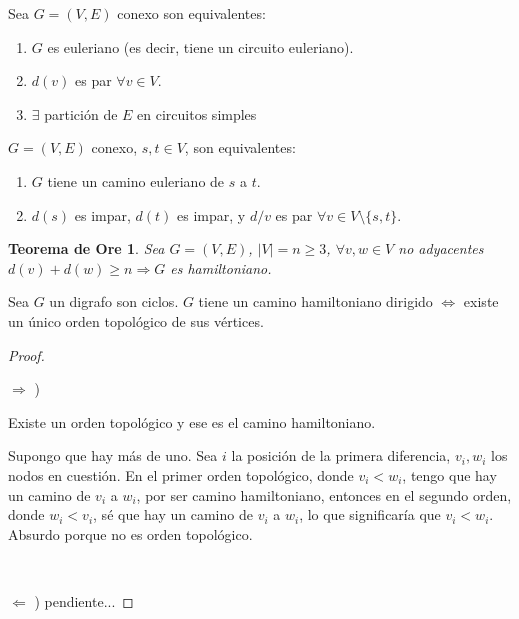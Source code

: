 \begin{teo}
Sea $G = (V, E)$ conexo son equivalentes:

\begin{enumerate}
    \item $G$ es euleriano (es decir, tiene un circuito euleriano).
    \item $d(v)$ es par $\forall v \in V$.
    \item $\exists$ partición de $E$ en circuitos simples
\end{enumerate}

\end{teo}

\begin{teo}
$G = (V, E)$ conexo, $s, t \in V$, son equivalentes:

\begin{enumerate}
    \item $G$ tiene un camino euleriano de $s$ a $t$.
    \item $d(s)$ es impar, $d(t)$ es impar, y $d/v$ es par $\forall v \in V \setminus \{s, t\}$.
\end{enumerate}

\end{teo}

\newtheorem*{Ore}{Teorema de Ore}
\begin{Ore}
    Sea $G = (V, E)$, $|V| = n \geq 3$, $\forall v, w \in V$ no adyacentes $d(v) + d(w) \geq n \Longrightarrow G$ es hamiltoniano.
\end{Ore}

\begin{teo}
    Sea $G$ un digrafo son ciclos. $G$ tiene un camino hamiltoniano dirigido $\Longleftrightarrow$ existe un único orden topológico de sus vértices.
\end{teo}

\begin{proof}
    ~

    $\Longrightarrow$ )

    Existe un orden topológico y ese es el camino hamiltoniano. 

    Supongo que hay más de uno. Sea $i$ la posición de la primera diferencia, $v_i, w_i$ los nodos en cuestión. En el primer orden topológico, donde $v_i < w_i$, tengo que hay un camino de $v_i$ a $w_i$, por ser camino hamiltoniano, entonces en el segundo orden, donde $w_i < v_i$, sé que hay un camino de $v_i$ a $w_i$, lo que significaría que $v_i < w_i$. Absurdo porque no es orden topológico.

    ~

    $\Longleftarrow$ ) pendiente...
\end{proof}

